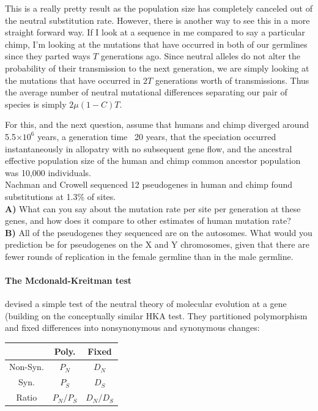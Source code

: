 This is a really pretty result as the population size has completely canceled
out of the neutral substitution rate. However, there is another way to see this
in a more straight forward way. If I look at a sequence in me compared to say a
particular chimp, I'm looking at the mutations that have occurred in both of
our germlines since they parted ways $T$ generations ago. Since neutral alleles
do not alter the probability of their transmission to the next generation, we
are simply looking at the mutations that have occurred in $2T$ generations
worth of transmissions. Thus the average number of neutral mutational
differences separating our pair of species is simply $2\mu (1-C) T$.\\



\begin{question}
For this, and the next question, assume that humans and chimp diverged
around 5.5$\times 10^6$ years, a generation time ~20 years, that the speciation occurred instantaneously in allopatry with no subsequent gene flow, and the ancestral effective population size of the human and chimp common ancestor population was 10,000 individuals.\\
Nachman and Crowell sequenced 12 pseudogenes in human and chimp found substitutions at 1.3\% of sites. \\
{\bf A) } What can you say about the mutation rate per site per generation at these genes, and how does it compare to other estimates of human mutation rate?\\
{\bf B)} All of the pseudogenes they sequenced are on the autosomes. What
would you prediction be for pseudogenes on the X and Y chromosomes,
given that there are fewer rounds of replication in the female
germline than in the male germline.
\end{question}


\paragraph{The Mcdonald-Kreitman test}
\citet{mcdonald:91} devised a simple test of the neutral theory of molecular
evolution at a gene (building on the conceptually similar HKA
test\cite{HKA}. They partitioned polymorphism and fixed differences into 
nonsynonymous and synonymous changes:
\begin{center}
\begin{tabular}{ccc}
 & Poly. & Fixed \\
\hline 
Non-Syn. &    $P_N$  &   $D_N$  \\
Syn. &    $P_S$   &     $D_S$   \\
Ratio & $P_N/P_S$ & $D_N/D_S$
\end{tabular}
\end{center}

